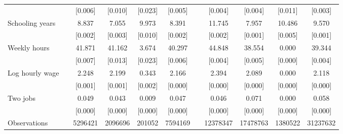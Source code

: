 \begin{tabular}{lrccccccccc}
      &       & [0.006] & [0.010] & [0.023] & [0.005] &       & [0.004] & [0.004] & [0.011] & [0.003] \\
Schooling years &       & 8.837 & 7.055 & 9.973 & 8.391 &       & 11.745 & 7.957 & 10.486 & 9.570 \\
      &       & [0.002] & [0.003] & [0.010] & [0.002] &       & [0.002] & [0.001] & [0.005] & [0.001] \\
Weekly hours &       & 41.871 & 41.162 & 3.674 & 40.297 &       & 44.848 & 38.554 & 0.000 & 39.344 \\
      &       & [0.007] & [0.013] & [0.023] & [0.006] &       & [0.004] & [0.005] & [0.000] & [0.004] \\
Log hourly wage &       & 2.248 & 2.199 & 0.343 & 2.166 &       & 2.394 & 2.089 & 0.000 & 2.118 \\
      &       & [0.001] & [0.001] & [0.002] & [0.000] &       & [0.000] & [0.000] & [0.000] & [0.000] \\
Two jobs &       & 0.049 & 0.043 & 0.009 & 0.047 &       & 0.046 & 0.071 & 0.000 & 0.058 \\
      &       & [0.000] & [0.000] & [0.000] & [0.000] &       & [0.000] & [0.000] & [0.000] & [0.000] \\
\midrule
Observations &       & 5296421 & 2096696 & 201052 & 7594169 &       & 12378347 & 17478763 & 1380522 & 31237632 \\
\bottomrule
\bottomrule
\end{tabular}%
